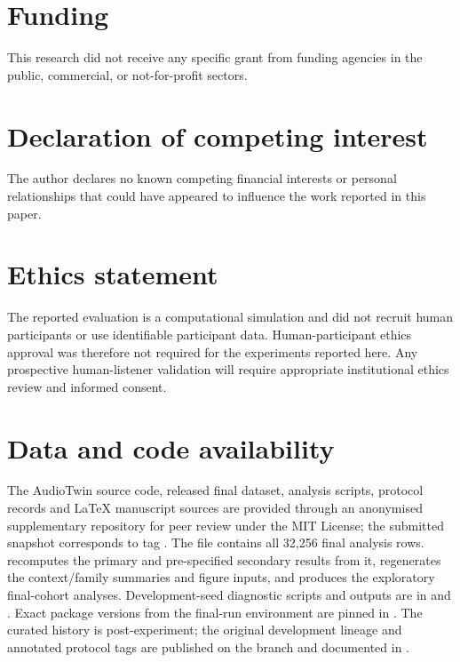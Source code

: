 \documentclass[preprint,12pt]{elsarticle}
\begin{document}
\section*{Funding}
This research did not receive any specific grant from funding agencies in the public, commercial, or not-for-profit sectors.

\section*{Declaration of competing interest}
The author declares no known competing financial interests or personal relationships that could have appeared to influence the work reported in this paper.

\section*{Ethics statement}
The reported evaluation is a computational simulation and did not recruit human participants or use identifiable participant data. Human-participant ethics approval was therefore not required for the experiments reported here. Any prospective human-listener validation will require appropriate institutional ethics review and informed consent.

\section*{Data and code availability}
The AudioTwin source code, released final dataset, analysis scripts, protocol records and LaTeX manuscript sources are provided through an anonymised supplementary repository for peer review under the MIT License; the submitted snapshot corresponds to tag . The file  contains all 32,256 final analysis rows.  recomputes the primary and pre-specified secondary results from it,  regenerates the context/family summaries and figure inputs, and  produces the exploratory final-cohort analyses. Development-seed diagnostic scripts and outputs are in  and . Exact package versions from the final-run environment are pinned in . The curated  history is post-experiment; the original development lineage and annotated protocol tags are published on the  branch and documented in .
\end{document}
